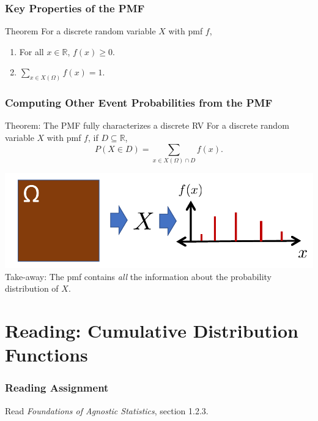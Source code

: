 \documentclass[12pt, block=fill]{beamer}
\newcommand{\R}{\mathbb{R}}
\begin{document}
 
\begin{frame}
  \frametitle{Key Properties of the PMF}

\begin{block}{Theorem}
  For a discrete random variable $X$ with pmf $f$, 
  
  \begin{enumerate}
  \item For all $x \in \R$, $f(x) \geq 0$.
  \item $\sum_{x \in X(\Omega)} f(x) = 1$.
  \end{enumerate}
\end{block}
  
\end{frame}
 
 
\begin{frame}
  \frametitle{Computing Other Event Probabilities from the PMF}

\begin{block}{Theorem: The PMF fully characterizes a discrete RV}
  For a discrete random variable $X$ with pmf $f$, if $D \subseteq \R$,
  $$  P(X \in D) = \sum_{x \in X(\Omega) \cap D } f(x).$$
\end{block}
\includegraphics[width= \textwidth]{figures/pmf_to_events} Take-away:
The pmf contains \textit{all} the information about the probability
distribution of $X$.
\end{frame}
 
\section{Reading: Cumulative Distribution Functions}

\begin{frame}
  \frametitle{Reading Assignment}
  Read \textit{Foundations of Agnostic Statistics}, section 1.2.3.
\end{frame}
 
\end{document}
